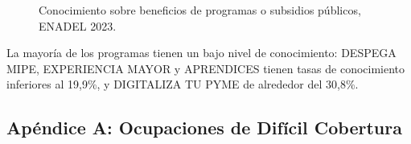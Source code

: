 \documentclass[
  11pt,
]{article}
\begin{document}
\begin{figure}[H]

\caption{\label{fig-conocimiento_2}Conocimiento sobre beneficios de
programas o subsidios públicos, ENADEL 2023.}


\end{figure}%

La mayoría de los programas tienen un bajo nivel de conocimiento:
DESPEGA MIPE, EXPERIENCIA MAYOR y APRENDICES tienen tasas de
conocimiento inferiores al 19,9\%, y DIGITALIZA TU PYME de alrededor del
30,8\%.

\newpage

\subsection{Apéndice A: Ocupaciones de Difícil
Cobertura}\label{apuxe9ndice-a-ocupaciones-de-difuxedcil-cobertura}
\end{document}
